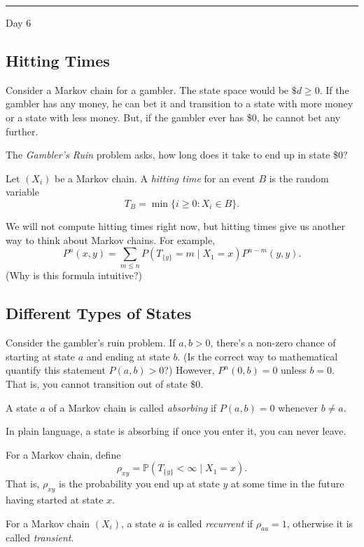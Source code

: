 \documentclass{problemset}
\renewcommand{\P}{\mathbb{P}}
\newcommand{\fatrule}[1]{\vspace{.3cm}\hrule {\hfill \sf #1}\par}
\begin{document}
	\fatrule{Day 6}

	\subsection*{Hitting Times}

	Consider a Markov chain for a gambler.  The state space would be $\$d\geq 0$.  If the gambler has any money,
	he can bet it and transition to a state with more money or a state with less money.  But, if the gambler 
	ever has \$0, he cannot bet any further.

	The \emph{Gambler's Ruin} problem asks, how long does it take to end up in state \$0?

	\begin{definition}
		Let $(X_i)$ be a Markov chain.  A \emph{hitting time} for an event $B$ is the random
		variable 
		\[
			T_B = \min\{i\geq 0: X_i\in B\}.
		\]
	\end{definition}

	We will not compute hitting times right now, but hitting times give us another way to think
	about Markov chains.  For example,
	\[
		P^n(x,y) = \sum_{m\leq n} P(T_{\{y\}}=m\mid X_1=x)P^{n-m}(y,y).
	\]
	(Why is this formula intuitive?)

	\subsection*{Different Types of States}

	Consider the gambler's ruin problem.  If $a,b>0$, there's a non-zero chance
	of starting at state $a$ and ending at state $b$.  (Is the correct way to
	mathematical quantify this statement $P(a,b)>0$?)  However, $P^n(0,b)=0$ unless $b=0$.
	That is, you cannot transition out of state $\$0$.

	\begin{definition}[Absorbing]
		A state $a$ of a Markov chain is called \emph{absorbing} if
		$P(a,b)=0$ whenever $b\neq a$.
	\end{definition}

	In plain language, a state is absorbing if once
	you enter it, you can never leave.

	For a Markov chain, define
	\[
		\rho_{xy} = \P(T_{\{y\}} < \infty\mid X_1=x).
	\]
	That is, $\rho_{xy}$ is the probability you end up at state $y$ at some
	time in the future having started at state $x$.

	\begin{definition}
		For a Markov chain $(X_i)$, a state $a$ is called \emph{recurrent}
		if $\rho_{aa}=1$, otherwise it is called \emph{transient}.
	\end{definition}
\end{document}
